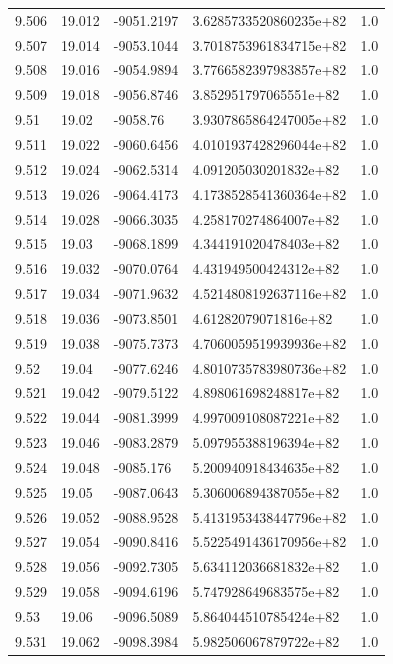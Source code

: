\begin{tabular}{lllll}
9.506 & 19.012 & -9051.2197 & 3.6285733520860235e+82 & 1.0 \\
9.507 & 19.014 & -9053.1044 & 3.7018753961834715e+82 & 1.0 \\
9.508 & 19.016 & -9054.9894 & 3.7766582397983857e+82 & 1.0 \\
9.509 & 19.018 & -9056.8746 & 3.852951797065551e+82 & 1.0 \\
9.51 & 19.02 & -9058.76 & 3.9307865864247005e+82 & 1.0 \\
9.511 & 19.022 & -9060.6456 & 4.0101937428296044e+82 & 1.0 \\
9.512 & 19.024 & -9062.5314 & 4.091205030201832e+82 & 1.0 \\
9.513 & 19.026 & -9064.4173 & 4.1738528541360364e+82 & 1.0 \\
9.514 & 19.028 & -9066.3035 & 4.258170274864007e+82 & 1.0 \\
9.515 & 19.03 & -9068.1899 & 4.344191020478403e+82 & 1.0 \\
9.516 & 19.032 & -9070.0764 & 4.431949500424312e+82 & 1.0 \\
9.517 & 19.034 & -9071.9632 & 4.5214808192637116e+82 & 1.0 \\
9.518 & 19.036 & -9073.8501 & 4.61282079071816e+82 & 1.0 \\
9.519 & 19.038 & -9075.7373 & 4.7060059519939936e+82 & 1.0 \\
9.52 & 19.04 & -9077.6246 & 4.8010735783980736e+82 & 1.0 \\
9.521 & 19.042 & -9079.5122 & 4.898061698248817e+82 & 1.0 \\
9.522 & 19.044 & -9081.3999 & 4.997009108087221e+82 & 1.0 \\
9.523 & 19.046 & -9083.2879 & 5.097955388196394e+82 & 1.0 \\
9.524 & 19.048 & -9085.176 & 5.200940918434635e+82 & 1.0 \\
9.525 & 19.05 & -9087.0643 & 5.306006894387055e+82 & 1.0 \\
9.526 & 19.052 & -9088.9528 & 5.4131953438447796e+82 & 1.0 \\
9.527 & 19.054 & -9090.8416 & 5.5225491436170956e+82 & 1.0 \\
9.528 & 19.056 & -9092.7305 & 5.634112036681832e+82 & 1.0 \\
9.529 & 19.058 & -9094.6196 & 5.747928649683575e+82 & 1.0 \\
9.53 & 19.06 & -9096.5089 & 5.864044510785424e+82 & 1.0 \\
9.531 & 19.062 & -9098.3984 & 5.982506067879722e+82 & 1.0 \\

\end{tabular}

